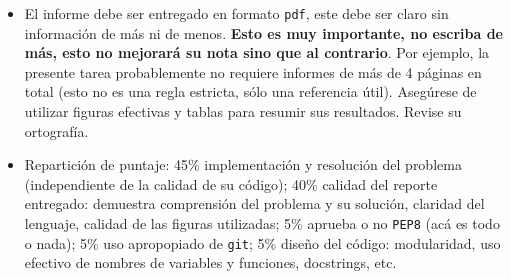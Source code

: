 \documentclass[letter, 11pt]{article}
\begin{document}
\begin{itemize}
  \item El informe debe ser entregado en formato \texttt{pdf}, este debe ser
    claro sin información de más ni de menos. \textbf{Esto es muy importante,
    no escriba de más, esto no mejorará su nota sino que al contrario}. Por
    ejemplo, la presente tarea probablemente no requiere informes de más de 4
    páginas en total (esto no es una regla estricta, sólo una referencia útil).
    Asegúrese de utilizar figuras efectivas y tablas para resumir sus
    resultados. Revise su ortografía.

  \item Repartición de puntaje: 45\% implementación y resolución del problema
    (independiente de la calidad de su código); 40\% calidad del reporte
    entregado: demuestra comprensión del problema y su solución, claridad del
    lenguaje, calidad de las figuras utilizadas; 5\% aprueba o no
    \texttt{PEP8} (acá es todo o nada); 5\% uso apropopiado de \texttt{git}; 5\%
    diseño del código: modularidad, uso efectivo de nombres de variables y
    funciones, docstrings, etc.

\end{itemize}
\end{document}
